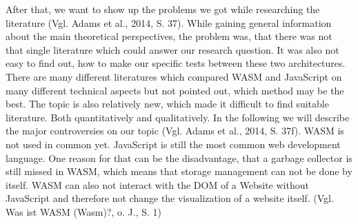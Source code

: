 After that, we want to show up the problems we got while researching the literature (Vgl. Adams et al., 2014, S. 37). While gaining general information about the main theoretical perspectives, the problem was, that there was not that single literature which could answer our research question. It was also not easy to find out, how to make our specific tests between these two architectures. There are many different literatures which compared WASM and JavaScript on many different technical aspects but not pointed out, which method may be the best. The topic is also relatively new, which made it difficult to find suitable literature. Both quantitatively and qualitatively.
In the following we will describe the major controversies on our topic (Vgl. Adams et al., 2014, S. 37f). WASM is not used in common yet. JavaScript is still the most common web development language. One reason for that can be the disadvantage, that a garbage collector is still missed in WASM, which means that storage management can not be done by itself. WASM can also not interact with the DOM of a Website without JavaScript and therefore not change the visualization of a website itself. (Vgl. Was ist WASM (Wasm)?, o. J., S. 1)
